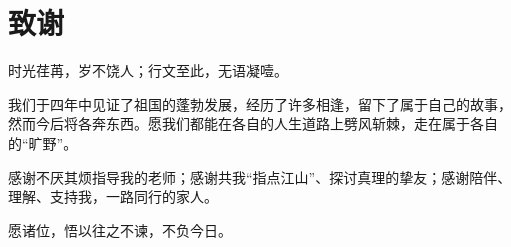 \documentclass[a4paper, UTF8, fontsize=12pt]{ctexart} %
\numberwithin{equation}{section} %
\begin{document}
\clearpage
{}


\clearpage


\section*{致谢}
时光荏苒，岁不饶人；行文至此，无语凝噎。

我们于四年中见证了祖国的蓬勃发展，经历了许多相逢，留下了属于自己的故事，然而今后将各奔东西。愿我们都能在各自的人生道路上劈风斩棘，走在属于各自的“旷野”。

感谢不厌其烦指导我的老师；感谢共我“指点江山”、探讨真理的挚友；感谢陪伴、理解、支持我，一路同行的家人。

愿诸位，悟以往之不谏，不负今日。
\end{document}
